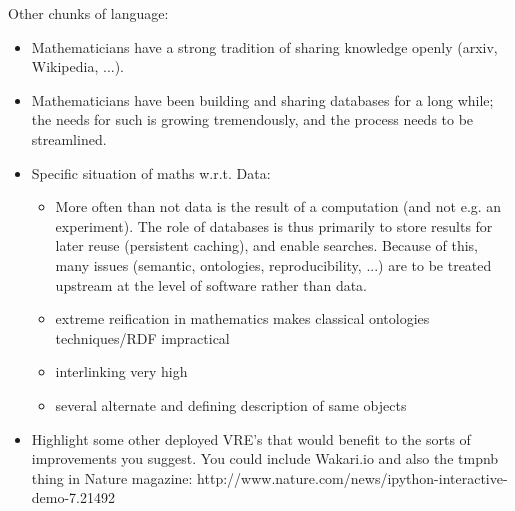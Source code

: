 \documentclass[a4paper,11pt]{article}
\begin{document}
Other chunks of language:
\begin{itemize}
\item Mathematicians have a strong tradition of sharing knowledge
  openly (arxiv, Wikipedia, ...).



\item Mathematicians have been building and sharing databases for a
  long while; the needs for such is growing tremendously, and the
  process needs to be streamlined.
\item Specific situation of maths w.r.t. Data:
  \begin{itemize}
  \item More often than not data is the result of a computation (and
    not e.g.  an experiment). The role of databases is thus primarily
    to store results for later reuse (persistent caching), and enable
    searches. Because of this, many issues (semantic, ontologies,
    reproducibility, ...) are to be treated upstream at the level of
    software rather than data.
  \item extreme reification in mathematics makes classical ontologies techniques/RDF impractical
  \item interlinking very high
  \item several alternate and defining description of same objects
  \end{itemize}
\item Highlight some other deployed VRE's that would benefit to the
  sorts of improvements you suggest.  You could include Wakari.io and
  also the tmpnb thing in Nature magazine:
  http://www.nature.com/news/ipython-interactive-demo-7.21492
\end{itemize}
\end{document}
